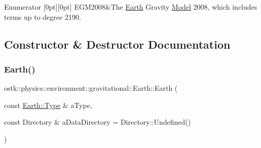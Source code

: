 \begin{DoxyEnumFields}{Enumerator}
[0pt][0pt]{}\mbox{\label{classostk_1_1physics_1_1environment_1_1gravitational_1_1_earth_a9895df78b5c5aab5e981bf765f8c0f05af22fbbe07f6feeaa3d6446dabcd8b164}} 
E\+G\+M2008&The \hyperlink{classostk_1_1physics_1_1environment_1_1gravitational_1_1_earth}{Earth} Gravity \hyperlink{classostk_1_1physics_1_1environment_1_1gravitational_1_1_model}{Model} 2008, which includes terms up to degree 2190. \\
\hline

\end{DoxyEnumFields}


\subsection{Constructor \& Destructor Documentation}
\mbox{\label{classostk_1_1physics_1_1environment_1_1gravitational_1_1_earth_a2266b9103f680d49643a5a8b4739a323}} 
\subsubsection{\texorpdfstring{Earth()}{Earth()}\hspace{0.1cm}{\footnotesize\ttfamily [1/2]}}
{\footnotesize\ttfamily ostk\+::physics\+::environment\+::gravitational\+::\+Earth\+::\+Earth (\begin{DoxyParamCaption}\item[{const \hyperlink{classostk_1_1physics_1_1environment_1_1gravitational_1_1_earth_a9895df78b5c5aab5e981bf765f8c0f05}{Earth\+::\+Type} \&}]{a\+Type,  }\item[{const Directory \&}]{a\+Data\+Directory = {\ttfamily Directory\+:\+:Undefined()} }\end{DoxyParamCaption})}



